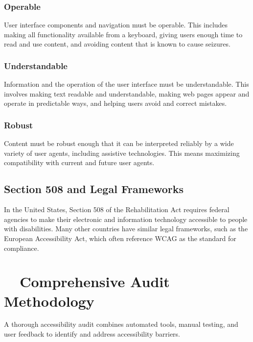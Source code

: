 \subsubsection{Operable}
\label{ssubsec:operable}
User interface components and \gls{navigation} must be operable. This includes making all functionality available from a keyboard, giving users enough time to read and use content, and avoiding content that is known to cause seizures.
\supercite{WebAIMKeyboardA11y}

\subsubsection{Understandable}
\label{ssubsec:understandable}
Information and the operation of the user interface must be understandable. This involves making text readable and understandable, making web pages appear and operate in predictable ways, and helping users avoid and correct mistakes.
\supercite{Redish2012}

\subsubsection{Robust}
\label{ssubsec:robust}
Content must be robust enough that it can be interpreted reliably by a wide variety of user agents, including assistive technologies. This means maximizing compatibility with current and future user agents.
\supercite{WCAGPrincipleRobust}

\subsection{Section 508 and Legal Frameworks}
\label{subsec:section508-legal}
In the United States, Section 508 of the Rehabilitation Act requires federal agencies to make their electronic and information technology accessible to people with disabilities. Many other countries have similar legal frameworks, such as the European Accessibility Act, which often reference WCAG as the standard for compliance.
\supercite{Section5082018, Jaeger2006}

\section{~~Comprehensive Audit Methodology}
\label{sec:audit-methodology}
A thorough accessibility audit combines automated tools, manual testing, and user feedback to identify and address accessibility barriers.
\supercite{Henry2007}


